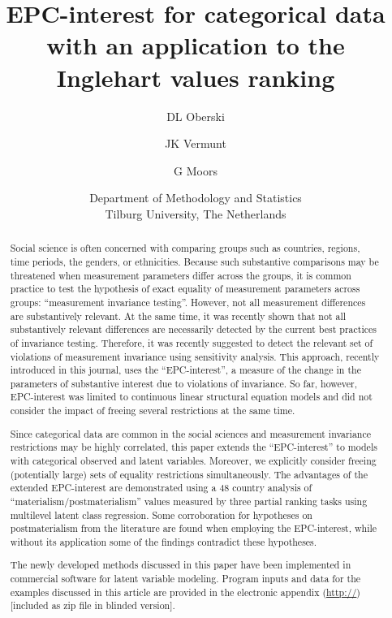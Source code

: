 \documentclass[letterpaper,12pt]{article}
\title{EPC-interest for categorical data with an application to the Inglehart values ranking}
\date{}
\author{DL Oberski \and JK Vermunt \and G Moors
\and
Department of Methodology and Statistics\\
Tilburg University, The Netherlands}
\begin{document}
\maketitle



\begin{abstract}
Social science is often concerned with comparing groups such as countries, regions, time periods, the genders, or ethnicities.
Because such substantive comparisons may be threatened when measurement parameters differ across the groups, it is common practice to test the hypothesis of exact equality of measurement parameters across groups:  ``measurement invariance testing''. However, not all measurement differences are substantively relevant. At the same time, it was recently shown that not all substantively relevant differences are necessarily detected by the current best practices of invariance testing. Therefore, it was recently suggested to detect the relevant set of violations of measurement invariance using sensitivity analysis. This approach, recently introduced in this journal, uses the ``EPC-interest'',  a measure of the change in the parameters of substantive interest due to violations of invariance. So far, however, EPC-interest was limited to continuous linear structural equation models and did not consider the impact of freeing several restrictions at the same time. 

Since categorical data are common in the social sciences and measurement invariance restrictions may be highly correlated, this paper extends the ``EPC-interest'' to models with categorical observed and latent variables. Moreover, we explicitly consider freeing (potentially large) sets of equality restrictions simultaneously. The advantages of the extended EPC-interest are demonstrated using a 48 country analysis of ``materialism/postmaterialism'' values measured by three partial ranking tasks using multilevel latent class regression. Some corroboration for hypotheses on postmaterialism from the literature are found when employing the EPC-interest, while without its application some of the findings contradict these hypotheses.

The newly developed methods discussed in this paper have been implemented in commercial software for latent variable modeling. Program inputs and data for the examples discussed in this article are provided in the electronic appendix (\url{http://}) [included as zip file in blinded version].
\end{abstract}
\end{document}
